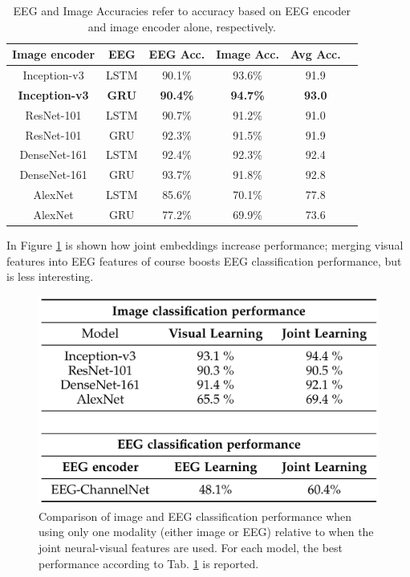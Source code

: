 \begin{table}[!ht]
    \centering
    \captionsetup{width=.8\linewidth}
    \begin{tabular}{cccccc}
    \hline
    \textbf{Image encoder} & \textbf{EEG} & \textbf{EEG Acc.} & \textbf{Image Acc.} & \textbf{Avg Acc.} \\
    \hline
    Inception-v3 & LSTM & 90.1\% & 93.6\% & 91.9 \\
    \textbf{Inception-v3} & \textbf{GRU} & \textbf{90.4\%} & \textbf{94.7\%} & \textbf{93.0} \\
    \hline
    ResNet-101 & LSTM & 90.7\% & 91.2\% & 91.0 \\
    ResNet-101 & GRU & 92.3\% & 91.5\% & 91.9 \\
    \hline
    DenseNet-161 & LSTM & 92.4\% & 92.3\% & 92.4 \\
    DenseNet-161 & GRU & 93.7\% & 91.8\% & 92.8 \\
    \hline
    AlexNet & LSTM & 85.6\% & 70.1\% & 77.8 \\
    AlexNet & GRU & 77.2\% & 69.9\% & 73.6 \\
    \hline
    \end{tabular}
    \caption{EEG and Image Accuracies refer to accuracy based on EEG encoder and image encoder alone, respectively.}
    \label{tab:palazzo}
\end{table}

In Figure \ref{fig:palazzo_2} is shown how joint embeddings increase performance; merging visual features into EEG features of course boosts EEG classification performance, but is less interesting.\\

\begin{figure}[!ht]
    \centering
    \captionsetup{width=.8\linewidth}
    \includegraphics[width=0.5\linewidth]{images/palazzo_2.png}
    \caption{Comparison of image and EEG classification performance when using only one modality (either image or EEG) relative to when the joint neural-visual features are used. For each model, the best performance according to Tab. \ref{tab:palazzo} is reported.}
    \label{fig:palazzo_2}
\end{figure}

